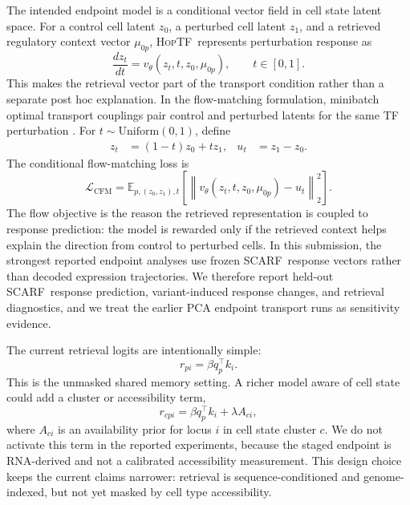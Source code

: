 \documentclass{article}
\newcommand{\hoptf}{\textsc{HopTF}}
\newcommand{\scarf}{\textsc{SCARF}}
\begin{document}
The intended endpoint model is a conditional vector field in cell state latent space. For a control cell latent \(z_0\), a perturbed cell latent \(z_1\), and a retrieved regulatory context vector \(\mu_{0p}\), \hoptf\ represents perturbation response as
\begin{equation}
    \frac{d z_t}{dt} = v_\theta(z_t, t, z_0, \mu_{0p}), \qquad t \in [0,1].
\end{equation}
This makes the retrieval vector part of the transport condition rather than a separate post hoc explanation. In the flow-matching formulation, minibatch optimal transport couplings pair control and perturbed latents for the same TF perturbation \citep{tong2024cfm,tong2024sf2m}. For \(t \sim \mathrm{Uniform}(0,1)\), define
\begin{align}
    z_t &= (1-t)z_0 + t z_1, &
    u_t &= z_1-z_0.
\end{align}
The conditional flow-matching loss is
\begin{equation}
    \mathcal{L}_{\mathrm{CFM}} =
    \mathbb{E}_{p,(z_0,z_1),t}\left[
    \left\|v_\theta(z_t,t,z_0,\mu_{0p}) - u_t\right\|_2^2
    \right].
\end{equation}
The flow objective is the reason the retrieved representation is coupled to response prediction: the model is rewarded only if the retrieved context helps explain the direction from control to perturbed cells. In this submission, the strongest reported endpoint analyses use frozen \scarf\ response vectors rather than decoded expression trajectories. We therefore report held-out \scarf\ response prediction, variant-induced response changes, and retrieval diagnostics, and we treat the earlier PCA endpoint transport runs as sensitivity evidence.

The current retrieval logits are intentionally simple:
\begin{equation}
    r_{pi}=\beta q_p^\top k_i.
\end{equation}
This is the unmasked shared memory setting. A richer model aware of cell state could add a cluster or accessibility term,
\begin{equation}
    r_{cpi}=\beta q_p^\top k_i + \lambda A_{ci},
\end{equation}
where \(A_{ci}\) is an availability prior for locus \(i\) in cell state cluster \(c\). We do not activate this term in the reported experiments, because the staged endpoint is RNA-derived and not a calibrated accessibility measurement. This design choice keeps the current claims narrower: retrieval is sequence-conditioned and genome-indexed, but not yet masked by cell type accessibility.
\end{document}
